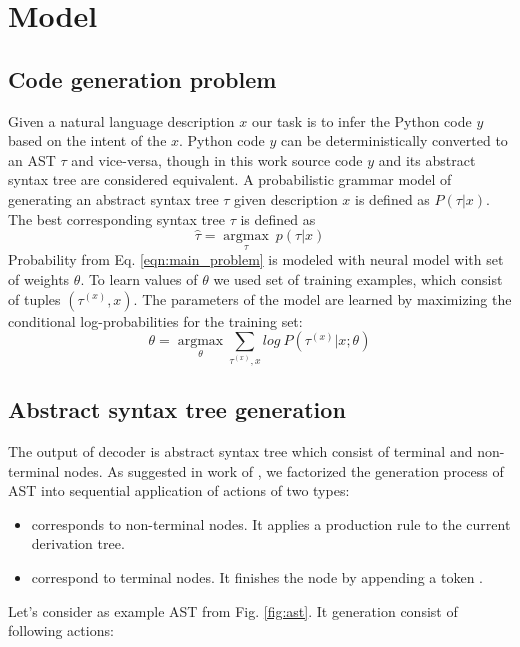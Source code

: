 \chapter{Model} 
\label{Chapter4}

\section{Code generation problem}
Given a natural language description $x$ our task is to infer the Python code $y$ based on the intent of the $x$. Python code $y$ can be deterministically converted to an AST $\tau$ and vice-versa, though in this work source code $y$ and its abstract syntax tree are considered equivalent. A probabilistic grammar model of generating an abstract syntax tree $\tau$ given description $x$ is defined as $P(\tau|x)$. The best corresponding syntax tree $\tau$ is defined as
\begin{equation}
\hat{\tau}=\underset{\tau}{\operatorname{argmax}}\: p(\tau|x)
\label{eqn:main_problem}
\end{equation}
Probability from Eq. \ref{eqn:main_problem} is modeled with neural model with set of weights $\theta$. To learn values of $\theta$ we used set of training examples, which consist of tuples $(\tau^{(x)}, x)$. The parameters of the model are learned by maximizing the conditional log-probabilities for the training set:
\begin{equation}
\theta=\underset{\theta}{\operatorname{argmax}} \sum_{\tau^{(x)}, x} log \: P(\tau^{(x)}|x; \theta)
\label{eqn:mle}
\end{equation}

\section{Abstract syntax tree generation}
The output of decoder is abstract syntax tree which consist of terminal and non-terminal nodes. As suggested in work of \cite{Yin2017}, we factorized the generation process of AST into sequential application of actions of two types:
\begin{itemize}
	\item {} corresponds to non-terminal nodes. It applies a production rule  to the current derivation tree.
	\item {} correspond to terminal nodes. It finishes the node by appending a token .
\end{itemize}

Let's consider as example AST from Fig. \ref{fig:ast}. It generation consist of following actions:

